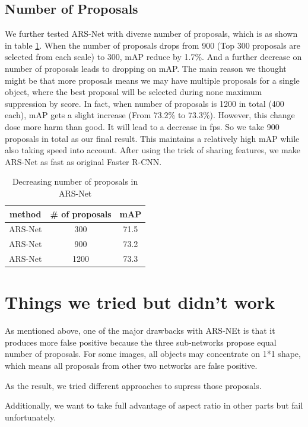 \documentclass[10pt,twocolumn,letterpaper]{article}
\begin{document}
\subsection{Number of Proposals}
We further tested ARS-Net with diverse number of proposals, which is as shown in table \ref{Exp2}. When the number of proposals drops from 900 (Top 300 proposals are selected from each scale) to 300, mAP reduce by 1.7\%. And a further decrease on number of proposals leads to dropping on mAP. The main reason we thought might be that more proposals means we may have multiple proposals for a single object, where the best proposal will be selected during none maximum suppression by score. In fact, when number of proposals is 1200 in total (400 each), mAP gets a slight increase (From 73.2\% to 73.3\%). However, this change dose more harm than good. It will lead to a decrease in fps. So we take 900 proposals in total as our final result. This maintains a relatively high mAP while also taking speed into account. After using the trick of sharing features, we make ARS-Net as fast as original Faster R-CNN.

\begin{table}[ht]
\label{Exp2}
\caption{Decreasing number of proposals in ARS-Net}
\centering
\begin{tabular}{|c|c|c|}
\hline 
 method & \# of proposals & mAP
\\ \hline 
 ARS-Net & 300 & 71.5
\\ \hline 
 ARS-Net & 900 & 73.2
\\ \hline 
 ARS-Net & 1200 & 73.3
\\ \hline
\end{tabular}
\end{table}


\section{Things we tried but didn't work}
\par
As mentioned above, one of the major drawbacks with ARS-NEt is that it produces more false positive because the three sub-networks propose equal number of proposals. For some images, all objects may concentrate on 1*1 shape, which means all proposals from other two networks are false positive.
\par
As the result, we tried different approaches to supress those proposals.
\par 
Additionally, we want to take full advantage of aspect ratio in other parts but fail unfortunately.
\end{document}
